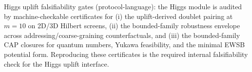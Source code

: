 \noindent Higgs uplift falsifiability gates (protocol-language): the Higgs module is audited by machine-checkable certificates for (i) the uplift-derived doublet pairing at $m=10$ on 2D/3D Hilbert screens, (ii) the bounded-family robustness envelope across addressing/coarse-graining counterfactuals, and (iii) the bounded-family CAP closures for quantum numbers, Yukawa feasibility, and the minimal EWSB potential form. Reproducing these certificates is the required internal falsifiability check for the Higgs uplift interface.